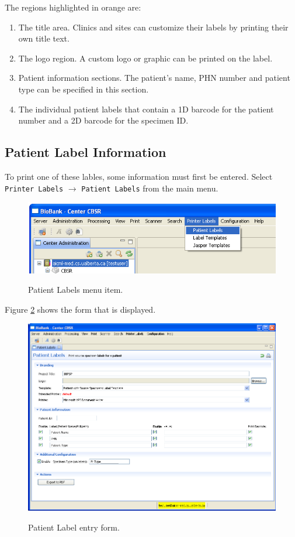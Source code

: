 The regions highlighted in orange are:
\begin{enumerate}
  \item The title area. Clinics and sites can customize their labels by
    printing their own title text.
  \item The logo region. A custom logo or graphic can be printed on the label.
  \item Patient information sections. The patient's name, PHN number and
    patient type can be specified in this section.
  \item The individual patient labels that contain a 1D barcode for the patient
    number and a 2D barcode for the specimen ID.
\end{enumerate}

\subsection{Patient Label Information}

To print one of these lables, some information must first be entered. Select
\texttt{Printer Labels} $\to$ \texttt{Patient Labels} from the main menu.

\begin{figure}[H]
  \centering
  \scalebox{0.35}
	   { \includegraphics*{screenshots/printer_labels/02_patient_labels_menu_item} }
	   \caption{Patient Labels menu item.}
	   \label{fig:patient_labels_menu_item}
\end{figure}

Figure \ref{fig:patient_label_form} shows the form that is displayed.

\begin{figure}[H]
  \centering
  \scalebox{0.35}
	   { \includegraphics*{screenshots/printer_labels/03_patient_label_form} }
	   \caption{Patient Label entry form.}
	   \label{fig:patient_label_form}
\end{figure}


